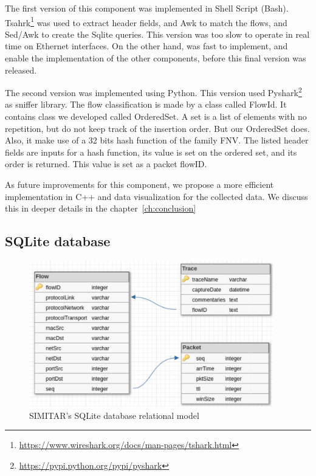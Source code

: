 The first version of this component was implemented in Shell Script (Bash).  Tsahrk\footnote{\href{https://www.wireshark.org/docs/man-pages/tshark.html}{https://www.wireshark.org/docs/man-pages/tshark.html}} was used to extract header fields, and Awk to match the flows, and Sed/Awk to create the Sqlite queries. This version was too slow to operate in real time on Ethernet interfaces. On the other hand, was fast to implement, and enable the implementation of the other components, before this final version was released.

The second version was implemented using Python. This version used Pyshark\footnote{\href{https://pypi.python.org/pypi/pyshark}{https://pypi.python.org/pypi/pyshark}} as sniffer library. The flow classification is made by a class called FlowId. It contains class we developed called OrderedSet. A set is a list of elements with no repetition, but do not keep track of the insertion order. But our OrderedSet does. Also, it make use of a  32 bits hash function of the family FNV. The listed header fields are inputs for a hash function, its value is set on the ordered set, and its order is returned. This value is set as a packet flowID.  

As future improvements for this component, we propose a more efficient implementation in C++ and data visualization for the collected data. We discuss this in deeper details in the chapter~\ref{ch:conclusion}




\subsection{SQLite database}

\begin{figure}[ht!]
        \centering
        \includegraphics[height=2.5in]{figures/ch3/database-relational-model}
        \caption{SIMITAR's SQLite database relational model}
    \label{fig:simitar-database}
\end{figure}

